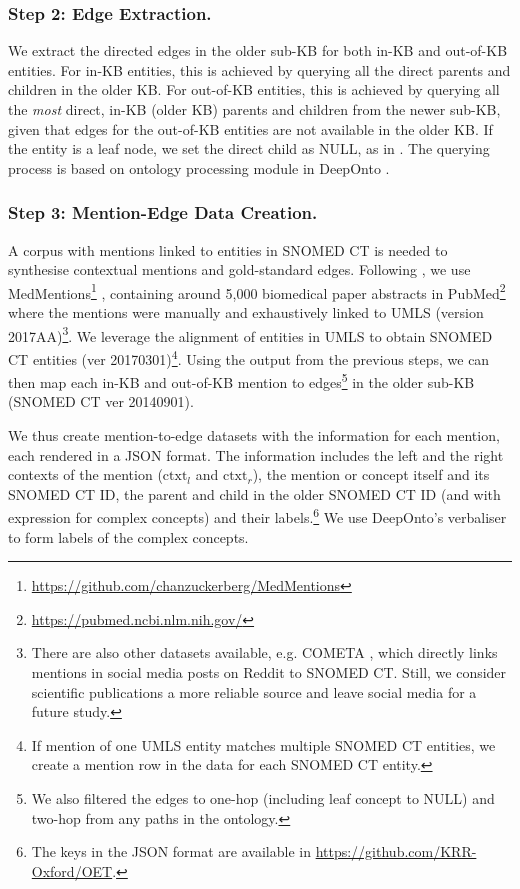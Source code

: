 \documentclass[sigconf]{acmart}
\begin{document}
	\subsubsection*{Step 2: Edge Extraction.}
	We extract the directed edges in the older sub-KB for both in-KB and out-of-KB entities. For in-KB entities, this is achieved by querying all the direct parents and children in the older KB. For out-of-KB entities, this is achieved by querying all the \textit{most} direct, in-KB (older KB) parents and children from the newer sub-KB, given that edges for the out-of-KB entities are not available in the older KB. If the entity is a leaf node, we set the direct child as NULL, as in \citet{zhang2021TMN}. The querying process is based on ontology processing module in DeepOnto \cite{he2023deeponto}.
	
	\subsubsection*{Step 3: Mention-Edge Data Creation.}
	A corpus with mentions linked to entities in SNOMED CT is needed to synthesise contextual mentions and gold-standard edges. Following \citet{dong2023NIL}, we use MedMentions\footnote{\url{https://github.com/chanzuckerberg/MedMentions}} \cite{Mohan2019medmentions}, containing around 5,000 biomedical paper abstracts in PubMed\footnote{\url{https://pubmed.ncbi.nlm.nih.gov/}} where the mentions were manually and exhaustively linked to UMLS \cite{Bodenreider2004umls} (version 2017AA)\footnote{There are also other datasets available, e.g. COMETA \cite{basaldella2020cometa}, which directly links mentions in social media posts on Reddit to SNOMED CT. Still, we consider scientific publications a more reliable source and leave social media for a future study.}. We leverage the alignment of entities in UMLS to obtain  SNOMED CT entities (ver 20170301)\footnote{If mention of one UMLS entity matches multiple SNOMED CT entities, we create a mention row in the data for each SNOMED CT entity.}. Using the output from the previous steps, we can then map each in-KB and out-of-KB mention to edges\footnote{We also filtered the edges to one-hop (including leaf concept to NULL) and two-hop from any paths in the ontology.} in the older sub-KB (SNOMED CT ver 20140901).
	
	We thus create mention-to-edge datasets with the information for each mention, each rendered in a JSON format. The information includes the left and the right contexts of the mention ($\text{ctxt}_l$ and $\text{ctxt}_r$), the mention or concept itself and its SNOMED CT ID, the parent and child in the older SNOMED CT ID (and with expression for complex concepts) and their labels.\footnote{The keys in the JSON format are available in \url{https://github.com/KRR-Oxford/OET}.} We use DeepOnto's verbaliser \cite{he2023deeponto,yuan2023ontolama} to form labels of the complex concepts.
	
\end{document}
